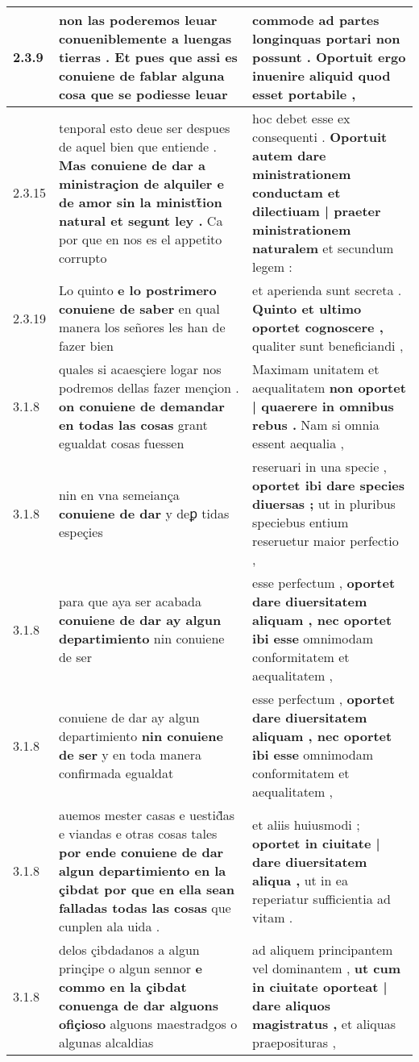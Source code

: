 \begin{tabular}{|p{1cm}|p{6.5cm}|p{6.5cm}|}
2.3.9 & non las poderemos leuar conueniblemente a luengas tierras . \textbf{ Et pues que assi es conuiene de fablar alguna cosa } que se podiesse leuar & commode ad partes longinquas portari non possunt . \textbf{ Oportuit ergo inuenire aliquid } quod esset portabile , \\\hline
2.3.15 & tenporal esto deue ser despues de aquel bien que entiende . \textbf{ Mas conuiene de dar a ministraçion de alquiler e de amor sin la ministt̃ion natural et segunt ley . } Ca por que en nos es el appetito corrupto & hoc debet esse ex consequenti . \textbf{ Oportuit autem dare ministrationem conductam et dilectiuam | praeter ministrationem naturalem } et secundum legem : \\\hline
2.3.19 & Lo quinto \textbf{ e lo postrimero conuiene de saber } en qual manera los señores les han de fazer bien & et aperienda sunt secreta . \textbf{ Quinto et ultimo oportet cognoscere , } qualiter sunt beneficiandi , \\\hline
3.1.8 & quales si acaesçiere logar nos podremos dellas fazer mençion . \textbf{ on conuiene de demandar en todas las cosas } grant egualdat cosas fuessen & Maximam unitatem et aequalitatem \textbf{ non oportet | quaerere in omnibus rebus . } Nam si omnia essent aequalia , \\\hline
3.1.8 & nin en vna semeiança \textbf{ conuiene de dar } y deꝑ tidas espeçies & reseruari in una specie , \textbf{ oportet ibi dare species diuersas ; } ut in pluribus speciebus entium reseruetur maior perfectio , \\\hline
3.1.8 & para que aya ser acabada \textbf{ conuiene de dar ay algun departimiento } nin conuiene de ser & esse perfectum , \textbf{ oportet dare diuersitatem aliquam , nec oportet ibi esse } omnimodam conformitatem et aequalitatem , \\\hline
3.1.8 & conuiene de dar ay algun departimiento \textbf{ nin conuiene de ser } y en toda manera confirmada egualdat & esse perfectum , \textbf{ oportet dare diuersitatem aliquam , nec oportet ibi esse } omnimodam conformitatem et aequalitatem , \\\hline
3.1.8 & auemos mester casas e uestid̃as e viandas e otras cosas tales \textbf{ por ende conuiene de dar algun departimiento en la çibdat por que en ella sean falladas todas las cosas } que cunplen ala uida . & et aliis huiusmodi ; \textbf{ oportet in ciuitate | dare diuersitatem aliqua , } ut in ea reperiatur sufficientia ad vitam . \\\hline
3.1.8 & delos çibdadanos a algun prinçipe o algun sennor \textbf{ e commo en la çibdat conuenga de dar alguons ofiçioso } alguons maestradgos o algunas alcaldias & ad aliquem principantem vel dominantem , \textbf{ ut cum in ciuitate oporteat | dare aliquos magistratus , } et aliquas praeposituras , \\\hline

\end{tabular}
